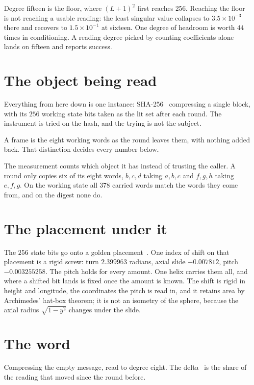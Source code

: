 Degree fifteen is the floor, where \((L+1)^2\) first reaches \(256\). Reaching the floor is not reaching a usable reading: the least singular value collapses to \(3.5 \times 10^{-3}\) there and recovers to \(1.5 \times 10^{-1}\) at sixteen. One degree of headroom is worth \(44\) times in conditioning. A reading degree picked by counting coefficients alone lands on fifteen and reports success.

\section{The object being read}

Everything from here down is one instance: SHA-256~\cite{src:FIPS-180-4} compressing a single block, with its \(256\) working state bits taken as the lit set after each round. The instrument is tried on the hash, and the trying is not the subject.

A frame is the eight working words as the round leaves them, with nothing added back. That distinction decides every number below.

The measurement counts which object it has instead of trusting the caller. A round only copies six of its eight words, \(b,c,d\) taking \(a,b,c\) and \(f,g,h\) taking \(e,f,g\). On the working state all \(378\) carried words match the words they come from, and on the digest none do.

\section{The placement under it}

The \(256\) state bits go onto a golden placement~\cite{src:Vogel-1979,src:Swinbank-and-Purser-2006}. One index of shift on that placement is a rigid screw: turn \(2.399963\) radians, axial slide \(-0.007812\), pitch \(-0.003255258\). The pitch holds for every amount. One helix carries them all, and where a shifted bit lands is fixed once the amount is known. The shift is rigid in height and longitude, the coordinates the pitch is read in, and it retains area by Archimedes' hat-box theorem; it is not an isometry of the sphere, because the axial radius \(\sqrt{1 - y^2}\) changes under the slide.

\section{The word}

Compressing the empty message, read to degree eight. The delta~\cite{src:Levin-Peres-and-Wilmer-2009} is the share of the reading that moved since the round before.

